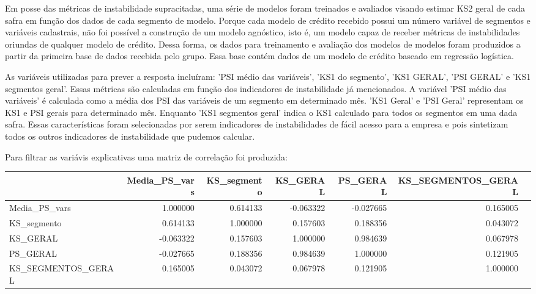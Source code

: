 Em posse das métricas de instabilidade supracitadas, uma série de modelos foram treinados e avaliados visando estimar KS2 geral de cada safra em função dos dados de cada segmento de modelo.
	Porque cada modelo de crédito recebido possui um número variável de segmentos e variáveis cadastrais, não foi possível a construção de um modelo agnóstico, isto é, um modelo capaz de receber métricas de instabilidades oriundas de qualquer modelo de crédito. Dessa forma, os dados para treinamento e avaliação dos modelos de modelos foram produzidos a partir da primeira base de dados recebida pelo grupo. Essa base contém dados de um modelo de crédito baseado em regressão logística.	
	
	As variáveis utilizadas para prever a resposta incluíram: 'PSI médio das variáveis', 'KS1 do segmento', 'KS1 GERAL', 'PSI GERAL' e 'KS1 segmentos geral'. Essas métricas são calculadas em função dos indicadores de instabilidade já mencionados. A variável 'PSI médio das variáveis' é calculada como a média dos PSI das variáveis de um segmento em determinado mês. 'KS1 Geral' e 'PSI Geral' representam os KS1 e PSI gerais para determinado mês. Enquanto 'KS1 segmentos geral' indica o KS1 calculado para todos os segmentos em uma dada safra. Essas características foram selecionadas por serem indicadores de instabilidades de fácil acesso para a empresa e pois sintetizam todos os outros indicadores de instabilidade que pudemos calcular.

    Para filtrar as variávis explicativas uma matriz de correlação foi produzida:

\begin{adjustwidth}{-10in}{}
\begin{table}[H]
\fontsize{8}{12}\selectfont %
\setlength{\tabcolsep}{3pt} %
\begin{tabular}{lrrrrrr}
\toprule
{} &  Media\_PS\_vars &  KS\_segmento &  KS\_GERAL &  PS\_GERAL &  KS\_SEGMENTOS\_GERAL \\
\midrule
Media\_PS\_vars      &       1.000000 &     0.614133 & -0.063322 & -0.027665 &            0.165005\\
KS\_segmento        &       0.614133 &     1.000000 &  0.157603 &  0.188356 &            0.043072\\
KS\_GERAL           &      -0.063322 &     0.157603 &  1.000000 &  0.984639 &            0.067978 \\
PS\_GERAL           &      -0.027665 &     0.188356 &  0.984639 &  1.000000 &            0.121905 \\
KS\_SEGMENTOS\_GERAL &       0.165005 &     0.043072 &  0.067978 &  0.121905 &            1.000000 \\
\bottomrule
\end{tabular}
\end{table}
\end{adjustwidth}

